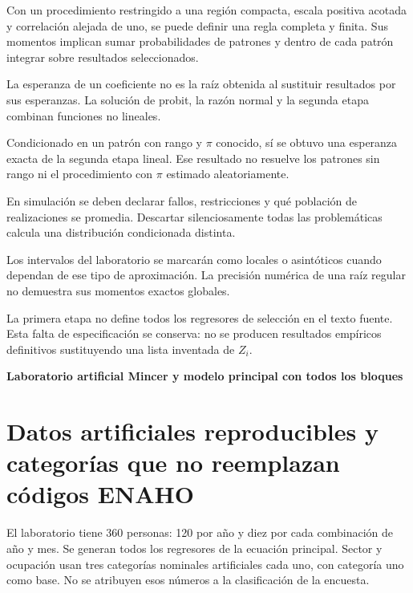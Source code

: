 \documentclass[11pt,a4paper]{article}
\begin{document}
Con un procedimiento restringido
a una región compacta,
escala positiva acotada y
correlación alejada de uno,
se puede definir una
regla completa y finita.
Sus momentos implican
sumar probabilidades de
patrones y dentro de
cada patrón integrar
sobre resultados seleccionados.

La esperanza de un
coeficiente no es
la raíz obtenida al
sustituir resultados por
sus esperanzas.
La solución de probit,
la razón normal y
la segunda etapa
combinan funciones no lineales.

\begin{ejemplo}
Condicionado en un patrón
con rango y \(\pi\) conocido,
sí se obtuvo una
esperanza exacta de
la segunda etapa lineal.
Ese resultado no
resuelve los patrones
sin rango ni el
procedimiento con \(\pi\)
estimado aleatoriamente.
\end{ejemplo}
En simulación se deben
declarar fallos, restricciones
y qué población de
realizaciones se promedia.
Descartar silenciosamente
todas las problemáticas
calcula una distribución
condicionada distinta.

Los intervalos del laboratorio
se marcarán como locales
o asintóticos cuando
dependan de ese tipo
de aproximación.
La precisión numérica
de una raíz regular
no demuestra sus
momentos exactos globales.


La primera etapa no define todos los regresores de selección en el texto fuente. Esta falta de especificación se conserva: no se producen resultados empíricos definitivos sustituyendo una lista inventada de $Z_i$.

\clearpage
{}
{\large\bfseries\color{azul}Laboratorio artificial Mincer y modelo principal con todos los bloques}\par\vspace{2mm}
\section{Datos artificiales reproducibles y categorías que no reemplazan códigos ENAHO}

El laboratorio tiene 360 personas: 120 por año y diez por cada combinación de año y mes. Se generan todos los regresores de la ecuación principal. Sector y ocupación usan tres categorías nominales artificiales cada uno, con categoría uno como base. No se atribuyen esos números a la clasificación de la encuesta.
\end{document}
